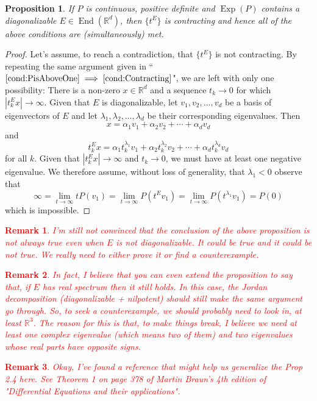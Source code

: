 \documentclass[11pt]{article}
\newtheorem{proposition}[theorem]{Proposition}
\newtheorem{remark}{Remark}
\newcommand\End{\operatorname{End}} %
\newcommand\Exp{\operatorname{Exp}}
\begin{document}
\textcolor{red}{\hline}
\begin{proposition}
If $P$ is continuous, positive definite and $\Exp(P)$ contains a diagonalizable $E\in\End(\mathbb{R}^d)$, then $\{t^E\}$ is contracting and hence all of the above conditions are (simultaneously) met. 
\end{proposition}
\begin{proof}
Let's assume, to reach a contradiction, that $\{t^E\}$ is not contracting. By repeating the same argument given in ``$\ref{cond:PisAboveOne}\implies\ref{cond:Contracting}$", we are left with only one possibility: There is a non-zero $x\in\mathbb{R}^d$ and a sequence $t_k\to 0$ for which $|t_k^Ex|\to\infty$. Given that $E$ is diagonalizable, let $v_1,v_2,\dots,v_d$ be a basis of eigenvectors of $E$ and let $\lambda_1,\lambda_2,\dots,\lambda_d$ be their corresponding eigenvalues. Then
\begin{equation*}
x=\alpha_1v_1+\alpha_2v_2+\cdots+\alpha_dv_d
\end{equation*}
and
\begin{equation*}
t_k^Ex=\alpha_1t_k^{\lambda_1}v_1+\alpha_2t_k^{\lambda_2}v_2+\cdots+\alpha_dt_k^{\lambda_d}v_d
\end{equation*}
for all $k$. Given that $|t_k^Ex|\to\infty$ and $t_k\to 0$, we must have at least one negative eigenvalue. We therefore assume, without loss of generality, that $\lambda_1<0$ observe that
\begin{equation*}
\infty=\lim_{t\to \infty}tP(v_1)=\lim_{t\to\infty}P(t^E v_1)=\lim_{t\to \infty}P(t^{\lambda_1} v_1)=P(0)
\end{equation*}
which is impossible.
\end{proof}
\textcolor{red}{\begin{remark}I'm still not convinced that the conclusion of the above proposition is not always true even when $E$ is not diagonalizable. It could be true and it could be not true. We really need to either prove it or find a counterexample.
\end{remark}
\begin{remark}
In fact, I believe that you can even extend the proposition to say that, if $E$ has real spectrum then it still holds. In this case, the Jordan decomposition (diagonalizable + nilpotent) should still make the same argument go through. So, to seek a counterexample, we should probably need to look in, at least $\mathbb{R}^3$. The reason for this is that, to make things break, I believe we need at least one complex eigenvalue (which means two of them) and two eigenvalues whose real parts have opposite signs.
\end{remark}
\begin{remark}
Okay, I've found a reference that might help us generalize the Prop 2.4 here. See Theorem 1 on page 378 of Martin Braun's 4th edition of "Differential Equations and their applications". 
\end{remark}}
\end{document}
